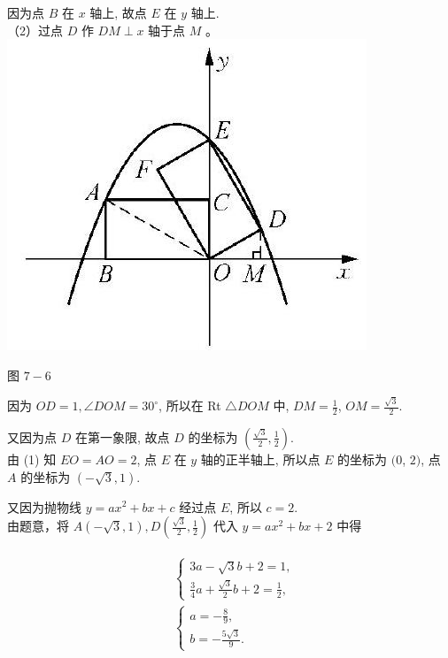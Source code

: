 \documentclass[10pt]{article}
\begin{document}
因为点 $B$ 在 $x$ 轴上, 故点 $E$ 在 $y$ 轴上.\\
（2）过点 $D$ 作 $D M \perp x$ 轴于点 $M$ 。\\
\includegraphics[max width=\textwidth, center]{2024_10_30_1bf34f7aeb61f11d11d3g-100}

图 $7-6$

因为 $O D=1, \angle D O M=30^{\circ}$, 所以在 Rt $\triangle D O M$ 中, $D M=\frac{1}{2}$, $O M=\frac{\sqrt{3}}{2}$.

又因为点 $D$ 在第一象限, 故点 $D$ 的坐标为 $\left(\frac{\sqrt{3}}{2}, \frac{1}{2}\right)$.\\
由 (1) 知 $E O=A O=2$, 点 $E$ 在 $y$ 轴的正半轴上, 所以点 $E$ 的坐标为 $(0$, $2)$, 点 $A$ 的坐标为 $(-\sqrt{3}, 1)$.

又因为抛物线 $y=a x^{2}+b x+c$ 经过点 $E$, 所以 $c=2$.\\
由题意，将 $A(-\sqrt{3}, 1), D\left(\frac{\sqrt{3}}{2}, \frac{1}{2}\right)$ 代入 $y=a x^{2}+b x+2$ 中得

\begin{align*}
\begin{aligned}
& \left\{\begin{array}{l}
3 a-\sqrt{3} b+2=1, \\
\frac{3}{4} a+\frac{\sqrt{3}}{2} b+2=\frac{1}{2},
\end{array}\right. \\
& \left\{\begin{array}{l}
a=-\frac{8}{9}, \\
b=-\frac{5 \sqrt{3}}{9} .
\end{array}\right.
\end{aligned}
\end{align*}
\end{document}
